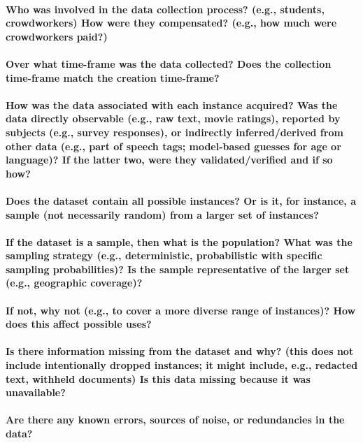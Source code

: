 \documentclass{article}
\begin{document}
\begin{multicols}{2}
\paragraph{Who was involved in the data collection process? (e.g.,
students, crowdworkers) How were they compensated? (e.g.,
how much were crowdworkers paid?)}
\paragraph{Over what time-frame was the data collected? Does the
collection time-frame match the creation time-frame?}
\paragraph{How was the data associated with each instance acquired? Was the data directly observable (e.g., raw text,
movie ratings), reported by subjects (e.g., survey responses),
or indirectly inferred/derived from other data (e.g., part of
speech tags; model-based guesses for age or language)? If
the latter two, were they validated/verified and if so how?}
\paragraph{Does the dataset contain all possible instances? Or is
it, for instance, a sample (not necessarily random) from a
larger set of instances?}
\paragraph{If the dataset is a sample, then what is the population?
What was the sampling strategy (e.g., deterministic, probabilistic with specific sampling probabilities)? Is the sample
representative of the larger set (e.g., geographic coverage)?}
\paragraph{If not, why not (e.g., to cover a more diverse range of instances)? How does this affect possible uses?}
\paragraph{Is there information missing from the dataset and why?
(this does not include intentionally dropped instances; it
might include, e.g., redacted text, withheld documents) Is
this data missing because it was unavailable?}
\paragraph{Are there any known errors, sources of noise, or redundancies in the data?}

\end{multicols}
\end{document}
